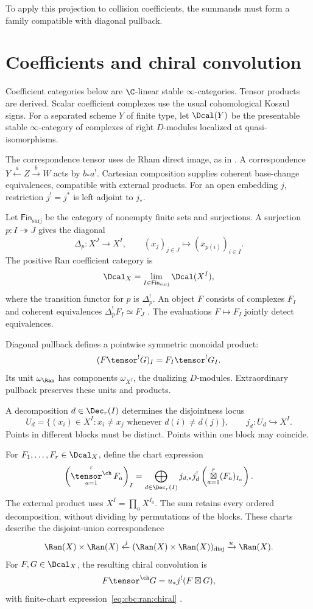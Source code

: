 To apply this projection to collision coefficients, the summands must
form a family compatible with diagonal pullback.

\section{Coefficients and chiral convolution}
Coefficient categories below are $\C$-linear stable $\infty$-categories.
Tensor products are derived. Scalar coefficient complexes use the usual
cohomological Koszul signs.
For a separated scheme $Y$ of finite type, let $\Dcal(Y)$ be the presentable
stable $\infty$-category of complexes of right $D$-modules localized
at quasi-isomorphisms.

The correspondence tensor uses de Rham direct image, as in
\cite[\S1.4]{FG12}.
A correspondence $Y\xleftarrow{a}Z\xrightarrow{b}W$ acts by $b_*a^!$.
Cartesian composition supplies coherent base-change equivalences,
compatible with external products.
For an open embedding $j$, restriction $j^!=j^*$ is left adjoint to $j_*$.

Let $\mathsf{Fin}_{\mathrm{surj}}$ be the category of nonempty finite sets
and surjections. A surjection $p:I\twoheadrightarrow J$ gives the diagonal
\[
 \Delta_p:X^J\longrightarrow X^I,\qquad
 (x_j)_{j\in J}\longmapsto(x_{p(i)})_{i\in I}.
\]
The positive Ran coefficient category is
\[
 \Dcal_X=\lim_{I\in\mathsf{Fin}_{\mathrm{surj}}}\Dcal(X^I),
\]
where the transition functor for $p$ is $\Delta_p^!$.
An object $F$ consists of complexes $F_I$ and coherent equivalences
$\Delta_p^!F_I\simeq F_J$ \cite[Definition 2.1.2]{FG12}.
The evaluations $F\mapsto F_I$ jointly detect equivalences.

Diagonal pullback defines a pointwise symmetric monoidal product:
\[
 (F\tensor^!G)_I=F_I\tensor^!G_I.
\]
Its unit $\omega_{\Ran}$ has components $\omega_{X^I}$, the dualizing
$D$-modules. Extraordinary pullback preserves these units and products.

A decomposition $d\in\Dec_r(I)$ determines the disjointness locus
\[
 U_d=\{(x_i)\in X^I:x_i\ne x_j\text{ whenever }d(i)\ne d(j)\},
 \qquad j_d:U_d\hookrightarrow X^I.
\]
Points in different blocks must be distinct. Points within one block
may coincide.

For $F_1,\ldots,F_r\in\Dcal_X$, define the chart expression
\begin{equation}
 \left(\mathop{\tensor^{\ch}}_{a=1}^r F_a\right)_I
 =\bigoplus_{d\in\Dec_r(I)}
 j_{d,*}j_d^!\left(\mathop{\boxtimes}_{a=1}^r(F_a)_{I_a}\right).
 \label{eq:cbc:ran:chiral}
\end{equation}
The external product uses $X^I=\prod_a X^{I_a}$.
The sum retains every ordered decomposition, without dividing by permutations of the blocks.
These charts describe the disjoint-union correspondence
\[
 \Ran(X)\times\Ran(X)\xleftarrow{j}
 (\Ran(X)\times\Ran(X))_{\mathrm{disj}}
 \xrightarrow{u}\Ran(X).
\]
For $F,G\in\Dcal_X$, the resulting chiral convolution is
\begin{equation}\label{eq:cbc:ran:star-convention}
 F\tensor^{\ch}G=u_*j^!(F\boxtimes G),
\end{equation}
with finite-chart expression~\eqref{eq:cbc:ran:chiral}
\cite[\S2.3.3 and Lemma~2.3.4]{FG12}.

